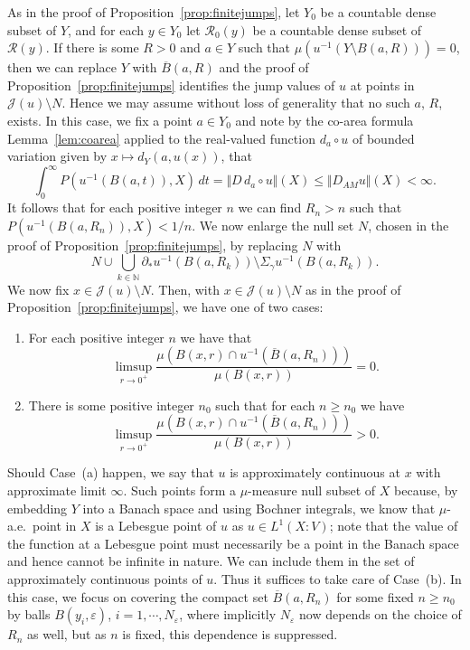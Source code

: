 \documentclass[11pt, letterpaper]{amsart} %
\newcommand*{\N}{{\mathbb N}}
\newcommand*{\eps}{\varepsilon}
\numberwithin{equation}{section}
\theoremstyle{plain}
\theoremstyle{definition}
\begin{document}
{As in the proof of Proposition~\ref{prop:finitejumps}, let $Y_0$ be a countable dense subset of $Y$, and for each
$y\in Y_0$ let $\mathcal{R}_0(y)$ be a countable dense subset of $\mathcal{R}(y)$. 
If there is some $R>0$ and $a\in Y$ such that $\mu(u^{-1}(Y\setminus B(a,R)))=0$, then we can replace $Y$ with
$\overline{B}(a,R)$ and the proof of Proposition~\ref{prop:finitejumps} identifies the jump values of $u$ at
points in $\mathcal{J}(u)\setminus N$. Hence we may assume without loss of generality that no such $a$, $R$, exists.
In this case, we fix a point $a\in Y_0$ and note by the co-area formula
Lemma~\ref{lem:coarea} applied to the real-valued function $d_a\circ u$ 
of bounded variation given by $x\mapsto d_Y(a,u(x))$, that
\[
\int_0^\infty P(u^{-1}(B(a,t)), X)\, dt=\Vert D\, d_a\circ u\Vert(X)\le \Vert D_{AM}u\Vert(X)<\infty.
\]
It follows that for each positive integer $n$ we can find $R_n>n$ such that 
$P(u^{-1}(B(a,R_n)), X)<1/n$. We now enlarge the null set $N$, chosen in 
the proof of Proposition~\ref{prop:finitejumps}, by replacing $N$ with 
\[
N\cup\bigcup_{k\in\N}\partial_*u^{-1}(B(a,R_k))\setminus\Sigma_\gamma u^{-1}(B(a,R_k)).
\]
We now fix $x\in\mathcal{J}(u)\setminus N$. Then, with 
$x\in \mathcal{J}(u)\setminus N$ as in the proof of Proposition~\ref{prop:finitejumps}, we have one of two cases:
\begin{enumerate}
\item[(a)] For each positive integer $n$ we have that
\[
\limsup_{r\to 0^+}\frac{\mu(B(x,r)\cap u^{-1}(\overline{B}(a,R_n)))}{\mu(B(x,r))}=0.
\]
\item[(b)] There is some positive integer $n_0$ such that for each $n\ge n_0$ we have 
\[
\limsup_{r\to 0^+}\frac{\mu(B(x,r)\cap u^{-1}(\overline{B}(a,R_n)))}{\mu(B(x,r))}>0.
\]
\end{enumerate}
Should Case~(a) happen, we say that $u$ is approximately continuous at $x$ with approximate limit $\infty$.
Such points form a $\mu$-measure null subset of $X$ because, by embedding $Y$ into a Banach space
and using Bochner integrals, we know that $\mu$-a.e.~point in $X$ is a Lebesgue point of $u$ as
$u\in L^1(X:V)$; note that the value of the function at a Lebesgue point must necessarily be a point in the Banach space
and hence cannot be infinite in nature.
We can include them in the set of approximately continuous
points of $u$. Thus it suffices to take care of Case~(b). In this case, we focus on covering the compact set
$\overline{B}(a,R_n)$ for some fixed $n\ge n_0$ by balls $B(y_i,\eps)$, $i=1,\cdots, N_\eps$, where implicitly
$N_\eps$ now depends on the choice of $R_n$ as well, but as $n$ is fixed, this dependence is suppressed. 
}
\end{document}
